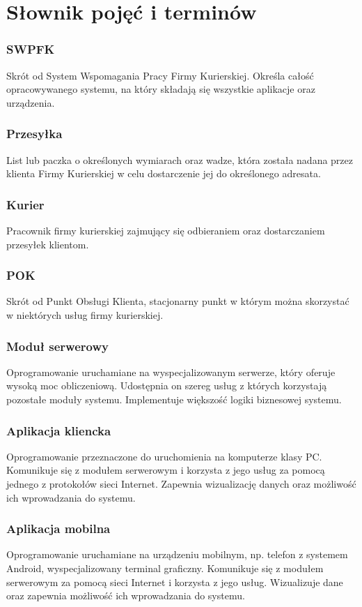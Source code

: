\section{Słownik pojęć i terminów}
\subsubsection*{SWPFK}
Skrót od System Wspomagania Pracy Firmy Kurierskiej. Określa całość opracowywanego systemu, na który składają się wszystkie aplikacje oraz urządzenia.

\subsubsection*{Przesyłka}
List lub paczka o określonych wymiarach oraz wadze, która została nadana przez klienta Firmy Kurierskiej w celu dostarczenie jej do określonego adresata.

\subsubsection*{Kurier}
Pracownik firmy kurierskiej zajmujący się odbieraniem oraz dostarczaniem przesyłek klientom.

\subsubsection*{POK}
Skrót od Punkt Obsługi Klienta, stacjonarny punkt w którym można skorzystać w niektórych usług firmy kurierskiej.

\subsubsection*{Moduł serwerowy}
Oprogramowanie uruchamiane na wyspecjalizowanym serwerze, który oferuje wysoką moc obliczeniową. Udostępnia on szereg usług z których korzystają pozostałe moduły systemu. Implementuje większość logiki biznesowej systemu.

\subsubsection*{Aplikacja kliencka}
Oprogramowanie przeznaczone do uruchomienia na komputerze klasy PC. Komunikuje się z modułem serwerowym i korzysta z jego usług za pomocą jednego z protokołów sieci Internet. Zapewnia wizualizację danych oraz możliwość ich wprowadzania do systemu.

\subsubsection*{Aplikacja mobilna}
Oprogramowanie uruchamiane na urządzeniu mobilnym, np. telefon z systemem Android, wyspecjalizowany terminal graficzny. Komunikuje się z modułem serwerowym za pomocą sieci Internet i korzysta z jego usług. Wizualizuje dane oraz zapewnia możliwość ich wprowadzania do systemu.

